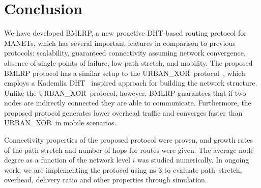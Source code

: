 \documentclass[conference]{IEEEtran}
\theoremstyle{definition}
\newcommand{\urbanxor}{URBAN\_XOR}
\begin{document}
\section{Conclusion}
\label{sec:conclusion}

We have developed BMLRP, a new proactive DHT-based routing protocol for MANETs, which has several important features in comparison to previous protocols: scalability, guaranteed connectivity assuming network convergence,  absence of single points of failure, low path stretch, and mobility. The proposed BMLRP protocol has a similar setup to the \urbanxor\ protocol~\cite{Pasquini}, which employs a Kademlia DHT~\cite{kademlia} inspired approach for building the network structure. Unlike the \urbanxor\ protocol, however, BMLRP guarantees that if two nodes are indirectly connected they are able to communicate. Furthermore, the proposed protocol generates lower overhead traffic and converges faster than \urbanxor\ in mobile scenarios.  

Connectivity properties of the proposed protocol were proven, and growth rates of the path stretch and number of hops for routes were given. The average node degree as a function of the network level $i$ was studied numerically. In ongoing work, we are implementing the protocol using ns-3 to evaluate path~stretch, overhead, delivery ratio and other properties through simulation.




\end{document}
